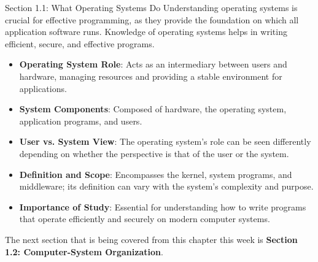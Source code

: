\begin{notes}{Section 1.1: What Operating Systems Do}
    Understanding operating systems is crucial for effective programming, as they provide the foundation on which all application software runs. Knowledge of operating systems helps in writing efficient, secure, and effective programs.
    
    \begin{highlight}
    
    \begin{itemize}
        \item \textbf{Operating System Role}: Acts as an intermediary between users and hardware, managing resources and providing a stable environment for applications.
        \item \textbf{System Components}: Composed of hardware, the operating system, application programs, and users.
        \item \textbf{User vs. System View}: The operating system's role can be seen differently depending on whether the perspective is that of the user or the system.
        \item \textbf{Definition and Scope}: Encompasses the kernel, system programs, and middleware; its definition can vary with the system's complexity and purpose.
        \item \textbf{Importance of Study}: Essential for understanding how to write programs that operate efficiently and securely on modern computer systems.
    \end{itemize}
    
    \end{highlight}
\end{notes}

The next section that is being covered from this chapter this week is \textbf{Section 1.2: Computer-System Organization}.

